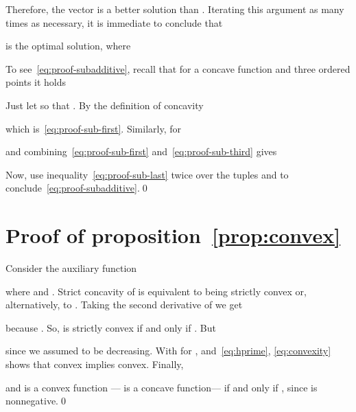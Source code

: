 \documentclass[journal,english,twocolumn,10pt,letterpaper]{IEEEtran}
\newcommand{\added}[1]{{#1}}
\begin{document}
Therefore, the vector  is a better solution tha\added{n} .
Iterating this argument as many times as necessary, it is immediate to
conclude that

is the optimal solution, where 

To see~\eqref{eq:proof-subadditive}, recall that for a concave function 
and three ordered points  it holds

Just let  so that .
By the definition of concavity

which is~\eqref{eq:proof-sub-first}. Similarly, for 

and combining~\eqref{eq:proof-sub-first} and~\eqref{eq:proof-sub-third} gives

Now, use inequality~\eqref{eq:proof-sub-last} twice over the tuples
 and  to
conclude~\eqref{eq:proof-subadditive}.\qed

\section{Proof of proposition~\ref{prop:convex}}
\label{sec:proof-proposition-convex}

Consider the auxiliary function

where  and .
Strict concavity of  is equivalent to  being strictly convex or,
alternatively, to . Taking the second derivative of
 we get

because . So,  is strictly convex if and only if . But

since we assumed  to be decreasing. With  for ,
 and~\eqref{eq:hprime}, \eqref{eq:convexity} shows that  convex
implies  convex. Finally,

and  is a convex function --- is a concave function--- if and only
if , since  is
nonnegative.\qed


\balance


\end{document}
